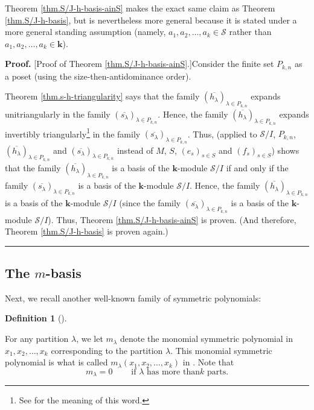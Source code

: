 \documentclass[numbers=enddot,12pt,final,onecolumn,notitlepage]{scrartcl}%
\theoremstyle{definition}
\newtheorem{defi}[theo]{Definition}
\newenvironment{definition}[1][]
{\begin{defi}[#1]\begin{leftbar}}
{\end{leftbar}\end{defi}}
\newenvironment{proof}[1][Proof]{\noindent\textbf{#1.} }{\ \rule{0.5em}{0.5em}}
\begin{document}
Theorem \ref{thm.S/J-h-basis-ainS} makes the exact same claim as Theorem
\ref{thm.S/J-h-basis}, but is nevertheless more general because it is stated
under a more general standing assumption (namely, $a_{1},a_{2},\ldots,a_{k}%
\in\mathcal{S}$ rather than $a_{1},a_{2},\ldots,a_{k}\in\mathbf{k}$).

\begin{proof}
[Proof of Theorem \ref{thm.S/J-h-basis-ainS}.]Consider the finite set
$P_{k,n}$ as a poset (using the size-then-antidominance order).

Theorem \ref{thm.s-h-triangularity} says that the family $\left(
\overline{h_{\lambda}}\right)  _{\lambda\in P_{k,n}}$ expands unitriangularly
in the family $\left(  \overline{s_{\lambda}}\right)  _{\lambda\in P_{k,n}}$.
Hence, the family $\left(  \overline{h_{\lambda}}\right)  _{\lambda\in
P_{k,n}}$ expands invertibly triangularly\footnote{See \cite[Definition
11.1.16(b)]{GriRei18} for the meaning of this word.} in the family $\left(
\overline{s_{\lambda}}\right)  _{\lambda\in P_{k,n}}$. Thus, \cite[Corollary
11.1.19(e)]{GriRei18} (applied to $\mathcal{S}/I$, $P_{k,n}$, $\left(
\overline{h_{\lambda}}\right)  _{\lambda\in P_{k,n}}$ and $\left(
\overline{s_{\lambda}}\right)  _{\lambda\in P_{k,n}}$ instead of $M$, $S$,
$\left(  e_{s}\right)  _{s\in S}$ and $\left(  f_{s}\right)  _{s\in S}$) shows
that the family $\left(  \overline{h_{\lambda}}\right)  _{\lambda\in P_{k,n}}$
is a basis of the $\mathbf{k}$-module $\mathcal{S}/I$ if and only if the
family $\left(  \overline{s_{\lambda}}\right)  _{\lambda\in P_{k,n}}$ is a
basis of the $\mathbf{k}$-module $\mathcal{S}/I$. Hence, the family $\left(
\overline{h_{\lambda}}\right)  _{\lambda\in P_{k,n}}$ is a basis of the
$\mathbf{k}$-module $\mathcal{S}/I$ (since the family $\left(  \overline
{s_{\lambda}}\right)  _{\lambda\in P_{k,n}}$ is a basis of the $\mathbf{k}%
$-module $\mathcal{S}/I$). Thus, Theorem \ref{thm.S/J-h-basis-ainS} is proven.
(And therefore, Theorem \ref{thm.S/J-h-basis} is proven again.)
\end{proof}

\subsection{The $m$-basis}

Next, we recall another well-known family of symmetric polynomials:

\begin{definition}
\label{def.mlam}For any partition $\lambda$, we let $m_{\lambda}$ denote the
monomial symmetric polynomial in $x_{1},x_{2},\ldots,x_{k}$ corresponding to
the partition $\lambda$. This monomial symmetric polynomial is what is called
$m_{\lambda}\left(  x_{1},x_{2},\ldots,x_{k}\right)  $ in \cite[Chapter
2]{GriRei18}. Note that%
\begin{equation}
m_{\lambda}=0\ \ \ \ \ \ \ \ \ \ \text{if }\lambda\text{ has more than
}k\text{ parts.} \label{eq.mlam=0-too-long}%
\end{equation}

\end{definition}
\end{document}
